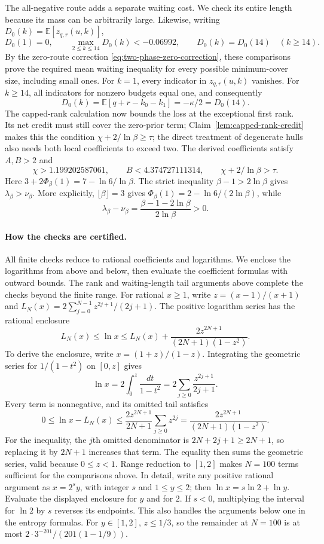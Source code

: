 The all-negative route adds a separate waiting cost. We check its
entire length because its mass can be arbitrarily large.
Likewise, writing $D_0(k)=\mathbb E[z_{q,r}(u,k)]$,
\[
 D_0(1)=0,\qquad \max_{2\le k\le14}D_0(k)<-0.06992,
 \qquad D_0(k)=D_0(14)\quad(k\ge14).
\]
By the zero-route correction \eqref{eq:two-phase-zero-correction},
these comparisons prove the required mean waiting inequality for every possible
minimum-cover size, including small ones.
For $k=1$, every indicator in $z_{q,r}(u,k)$ vanishes. For $k\ge14$,
all indicators for nonzero budgets equal one, and consequently
\[
 D_0(k)=\mathbb E[q+r-k_0-k_1]=-\kappa/2=D_0(14).
\]
The capped-rank calculation now bounds the loss at the exceptional
first rank. Its net credit must still cover the zero-prior term;
Claim~\ref{lem:capped-rank-credit} makes this the condition
$\chi+2/\ln\beta\ge\tau$; the direct treatment of degenerate hulls also needs both local
coefficients to exceed two.
The derived coefficients satisfy $A,B>2$ and
\[
 \chi>1.199202587061,\qquad
 B<4.374727111314,\qquad \chi+2/\ln\beta>\tau.
\]
Here $3+2\Phi_\beta(1)=7-\ln6/\ln\beta$. The strict inequality
$\beta-1>2\ln\beta$ gives $\lambda_\beta>\nu_\beta$.
More explicitly, $\lfloor\beta\rfloor=3$ gives
$\Phi_\beta(1)=2-\ln6/(2\ln\beta)$, while
\[
 \lambda_\beta-\nu_\beta
 =\frac{\beta-1-2\ln\beta}{2\ln\beta}>0.
\]

\paragraph{How the checks are certified.}
All finite checks reduce to rational coefficients and logarithms.
We enclose the logarithms from above and below, then evaluate the
coefficient formulas with outward bounds. The rank and waiting-length
tail arguments above complete the checks beyond the finite range.
For rational $x\ge1$, write $z=(x-1)/(x+1)$ and
$L_N(x)=2\sum_{j=0}^{N-1}z^{2j+1}/(2j+1)$.
The positive logarithm series has the rational enclosure
\begin{equation}\label{eq:rational-log-bounds}
 L_N(x)\le\ln x\le L_N(x)+
 \frac{2z^{2N+1}}{(2N+1)(1-z^2)}.
\end{equation}
To derive the enclosure, write $x=(1+z)/(1-z)$. Integrating the
geometric series for $1/(1-t^2)$ on $[0,z]$ gives
\[
 \ln x=2\int_0^z\frac{dt}{1-t^2}
       =2\sum_{j\ge0}\frac{z^{2j+1}}{2j+1}.
\]
Every term is nonnegative, and its omitted tail satisfies
\[
 0\le\ln x-L_N(x)
 \le\frac{2z^{2N+1}}{2N+1}\sum_{j\ge0}z^{2j}
 =\frac{2z^{2N+1}}{(2N+1)(1-z^2)}.
\]
For the inequality, the $j$th omitted denominator is
$2N+2j+1\ge2N+1$, so replacing it by $2N+1$ increases that term.
The equality then sums the geometric series, valid because $0\le z<1$.
Range reduction to $[1,2]$ makes $N=100$ terms sufficient for the
comparisons above. In detail, write any positive rational argument
as $x=2^s y$, with integer $s$ and $1\le y\le2$; then
$\ln x=s\ln2+\ln y$. Evaluate the displayed enclosure for $y$
and for $2$. If $s<0$, multiplying the interval for $\ln2$ by $s$
reverses its endpoints. This also handles the arguments below one
in the entropy formulas. For $y\in[1,2]$, $z\le1/3$, so the
remainder at $N=100$ is at most
$2\cdot3^{-201}/(201(1-1/9))$.

